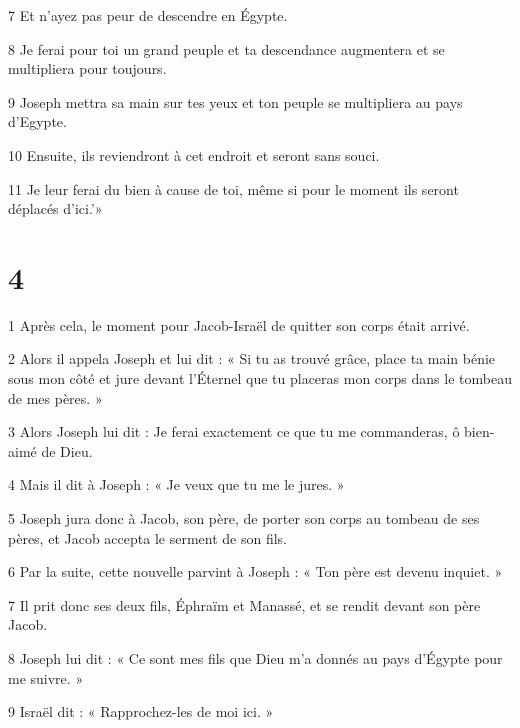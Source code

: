 \par 7 Et n'ayez pas peur de descendre en Égypte.

\par 8 Je ferai pour toi un grand peuple et ta descendance augmentera et se multipliera pour toujours.

\par 9 Joseph mettra sa main sur tes yeux et ton peuple se multipliera au pays d'Egypte.

\par 10 Ensuite, ils reviendront à cet endroit et seront sans souci.

\par 11 Je leur ferai du bien à cause de toi, même si pour le moment ils seront déplacés d'ici.'»

\chapter{4}

\par 1 Après cela, le moment pour Jacob-Israël de quitter son corps était arrivé.

\par 2 Alors il appela Joseph et lui dit : « Si tu as trouvé grâce, place ta main bénie sous mon côté et jure devant l'Éternel que tu placeras mon corps dans le tombeau de mes pères. »

\par 3 Alors Joseph lui dit : Je ferai exactement ce que tu me commanderas, ô bien-aimé de Dieu.

\par 4 Mais il dit à Joseph : « Je veux que tu me le jures. »

\par 5 Joseph jura donc à Jacob, son père, de porter son corps au tombeau de ses pères, et Jacob accepta le serment de son fils.

\par 6 Par la suite, cette nouvelle parvint à Joseph : « Ton père est devenu inquiet. »

\par 7 Il prit donc ses deux fils, Éphraïm et Manassé, et se rendit devant son père Jacob.

\par 8 Joseph lui dit : « Ce sont mes fils que Dieu m'a donnés au pays d'Égypte pour me suivre. »

\par 9 Israël dit : « Rapprochez-les de moi ici. »

